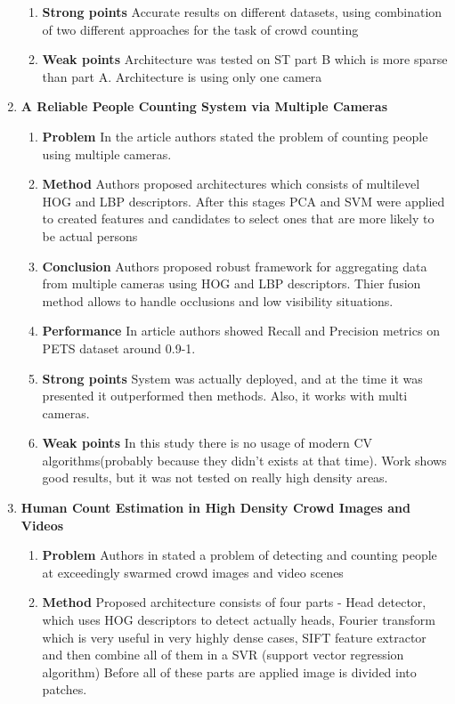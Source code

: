 \begin{enumerate}
\begin{enumerate}
        \item \textbf{Strong points}
        Accurate results on different datasets, using combination of two different approaches for the task of crowd counting
        \item \textbf{Weak points}
        Architecture was tested on ST part B which is more sparse than part A. Architecture is using only one camera
    \end{enumerate}
    \item \textbf{A Reliable People Counting System via Multiple Cameras }
    \begin{enumerate}
        \item \textbf{Problem}
        In the article \cite{10.1145/2089094.2089107} authors stated the problem of counting people using multiple cameras. 
        \item \textbf{Method}
        Authors proposed architectures which consists of multilevel HOG and LBP descriptors. After this stages PCA and SVM were applied to created features and  candidates to select ones that are more likely to be actual persons
        \item \textbf{Conclusion}
        Authors proposed robust framework for aggregating data from multiple cameras using HOG and LBP descriptors. Thier fusion method allows to handle occlusions and low visibility situations.
        \item \textbf{Performance}
        In article authors showed Recall and Precision metrics on PETS dataset around 0.9-1.
        \item \textbf{Strong points}
        System was actually deployed, and at the time it was presented it outperformed then methods. Also, it works with multi cameras.
        \item \textbf{Weak points}
        In this study there is no usage of modern CV algorithms(probably because they didn't exists at that time). Work shows good results, but it was not tested on really high density areas.
    \end{enumerate}
    \item \textbf{Human Count Estimation in High Density Crowd Images and Videos}
    \begin{enumerate}
        \item \textbf{Problem}
        Authors in \cite{7913173} stated a problem of detecting and counting people at exceedingly swarmed crowd images and video scenes
        \item \textbf{Method}
        Proposed architecture consists of four parts  - Head detector, which uses HOG descriptors to detect actually heads, Fourier transform which is very useful in very highly dense cases, SIFT feature extractor and then combine all of them in a SVR (support vector regression algorithm)  Before all of these parts are applied image is divided into patches.

\end{enumerate}
\end{enumerate}
